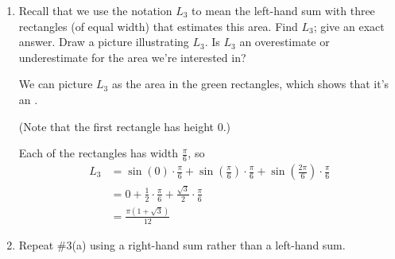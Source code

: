 \documentclass{article}
\begin{document}
\begin{enumerate}
  \begin{enumerate}

  \item
\begin{problem}[\stretch{2}]
      Recall that we use the notation $L_3$ to mean the left-hand sum with
      three rectangles (of equal width) that estimates this area.  Find
      $L_3$; give an exact answer.  Draw a picture illustrating $L_3$.  Is
      $L_3$ an overestimate or underestimate for the area we're interested
      in?
    \end{problem}

    \begin{solution} %
      We can picture $L_3$ as the area in the green rectangles, which
      shows that it's an .
      \begin{center}
      \end{center}
      (Note that the first rectangle has height 0.)

      Each of the rectangles has width $\frac{\pi}{6}$, so
      \begin{align*}
        L_3 &= \sin(0) \cdot \frac{\pi}{6} + \sin \left( \frac{\pi}{6}
        \right) \cdot \frac{\pi}{6} + \sin \left( \frac{2 \pi}{6} \right)
        \cdot \frac{\pi}{6} \\
        &= 0 + \frac{1}{2} \cdot \frac{\pi}{6} + \frac{\sqrt{3}}{2} \cdot
        \frac{\pi}{6} \\
        &= \boxed{\frac{\pi (1 + \sqrt{3})}{12}}
      \end{align*}
    \end{solution}

    \pspace{\newpage}

  \item
    \begin{problem}[\vfill]
      Repeat {{{{\#3}}(a)}} using a right-hand sum rather than
      a left-hand sum.
    \end{problem}


\end{enumerate}
\end{enumerate}
\end{document}
